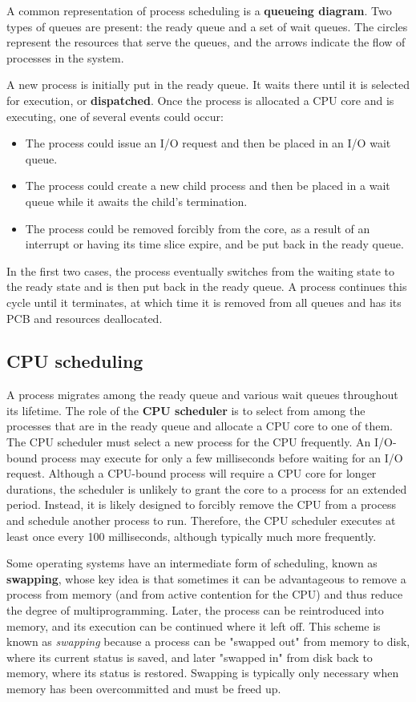A common representation of process scheduling is a \textbf{queueing diagram}. Two types of queues are present: the ready queue and a set of wait queues. The circles represent the resources that serve the queues, and the arrows indicate the flow of processes in the system.

A new process is initially put in the ready queue. It waits there until it is selected for execution, or \textbf{dispatched}. Once the process is allocated a CPU core and is executing, one of several events could occur:
\begin{itemize}
    \item The process could issue an I/O request and then be placed in an I/O wait queue.
    \item The process could create a new child process and then be placed in a wait queue while it awaits the child's termination.
    \item The process could be removed forcibly from the core, as a result of an interrupt or having its time slice expire, and be put back in the ready queue.
\end{itemize}
In the first two cases, the process eventually switches from the waiting state to the ready state and is then put back in the ready queue. A process continues this cycle until it terminates, at which time it is removed from all queues and has its PCB and resources deallocated.

\subsection*{CPU scheduling}\label{sec:3.2:cpu_scheduling}
A process migrates among the ready queue and various wait queues throughout its lifetime. The role of the \textbf{CPU scheduler} is to select from among the processes that are in the ready queue and allocate a CPU core to one of them. The CPU scheduler must select a new process for the CPU frequently. An I/O-bound process may execute for only a few milliseconds before waiting for an I/O request. Although a CPU-bound process will require a CPU core for longer durations, the scheduler is unlikely to grant the core to a process for an extended period. Instead, it is likely designed to forcibly remove the CPU from a process and schedule another process to run. Therefore, the CPU scheduler executes at least once every 100 milliseconds, although typically much more frequently.

Some operating systems have an intermediate form of scheduling, known as \textbf{swapping}, whose key idea is that sometimes it can be advantageous to remove a process from memory (and from active contention for the CPU) and thus reduce the degree of multiprogramming. Later, the process can be reintroduced into memory, and its execution can be continued where it left off. This scheme is known as \textit{swapping} because a process can be "swapped out" from memory to disk, where its current status is saved, and later "swapped in" from disk back to memory, where its status is restored. Swapping is typically only necessary when memory has been overcommitted and must be freed up.

